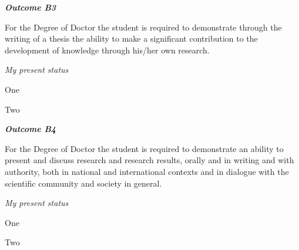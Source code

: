 \vspace{1em}
\hfill\begin{minipage}{\dimexpr\textwidth-1cm}
\noindent \textbf{\emph{Outcome B3}}

\noindent For the Degree of Doctor the student is required to demonstrate through the writing of a thesis the ability to make a significant contribution to the development of knowledge through his/her own research.\\

\xdef\tpd{\the\prevdepth}

\end{minipage}

\noindent \emph{My present status}
\begin{outcomes}
    \item One
    \item Two
\end{outcomes}

















\vspace{1em}
\hfill\begin{minipage}{\dimexpr\textwidth-1cm}
\noindent \textbf{\emph{Outcome B4}}

\noindent For the Degree of Doctor the student is required to demonstrate an ability to present and discuss research and research results, orally and in writing and with authority, both in national and international contexts and in dialogue with the scientific community and society in general.\\

\xdef\tpd{\the\prevdepth}

\end{minipage}

\noindent \emph{My present status}
\begin{outcomes}
    \item One
    \item Two
\end{outcomes}

















